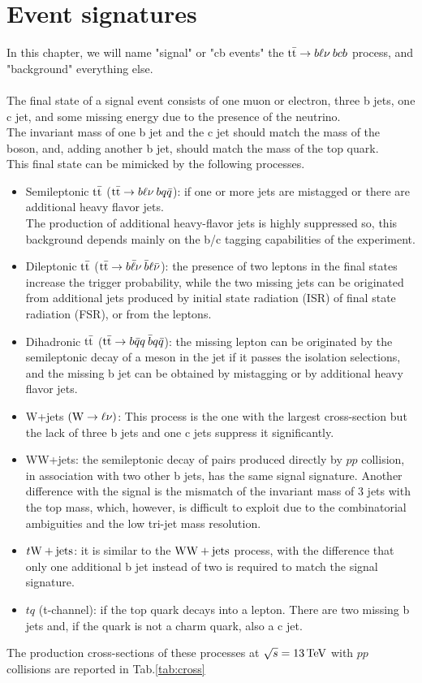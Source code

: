 \section{Event signatures}
In this chapter, we will name "signal" or "cb events" the ${{\text{t}}{\bar{\text{t}}}} \to b\ell\nu\: bcb$ process, and "background" everything else.\\
\\
The final state of a signal event consists of one muon or electron, three b jets, one c jet, and some missing energy due to the presence of the neutrino.\\
The invariant mass of one b jet and the c jet should match the mass of the \PW boson, and, adding another b jet, should match the mass of the top quark.\\
This final state can be mimicked by the following processes.
\begin{itemize}
    \item Semileptonic ${{\text{t}}{\bar{\text{t}}}}$ (${{\text{t}}{\bar{\text{t}}}}\to b\ell\nu \: bq\bar{q}$): if one or more jets are mistagged or there are additional heavy flavor jets.\\
    The production of additional heavy-flavor jets is highly suppressed so, this background depends mainly on the b/c tagging capabilities of the experiment.
    \item Dileptonic ${{\text{t}}{\bar{\text{t}}}}$ (${{\text{t}}{\bar{\text{t}}}} \to b\bar{\ell}\nu \: \bar{b}\ell\bar{\nu}$): the presence of two leptons in the final states increase the trigger probability, while the two missing jets can be originated from additional jets produced by initial state radiation (ISR) of final state radiation (FSR), or from the leptons.
    \item Dihadronic ${{\text{t}}{\bar{\text{t}}}}$ (${{\text{t}}{\bar{\text{t}}}} \to b\bar{q}q \: \bar{b}q\bar{q}$): the missing lepton can be originated by the semileptonic decay of a meson in the jet if it passes the isolation selections, and the missing b jet can be obtained by mistagging or by additional heavy flavor jets.
    \item W+jets $({\text{W}} \to \ell \nu)$: This process is the one with the largest cross-section but the lack of three b jets and one c jets suppress it significantly.
    \item WW+jets: the semileptonic decay of \PW pairs produced directly by $pp$ collision, in association with two other b jets, has the same signal signature. Another difference with the signal is the mismatch of the invariant mass of 3 jets with the top mass, which, however, is difficult to exploit due to the combinatorial ambiguities and the low tri-jet mass resolution.  
    \item $t{\text{W}}+\text{jets}$: it is similar to the ${\text{W}} {\text{W}} + \text{jets}$ process, with the difference that only one additional b jet instead of two is required to match the signal signature.
    \item $tq$ (t-channel): if the top quark decays into a lepton. There are two missing b jets and, if the quark is not a charm quark, also a c jet.
\end{itemize}
The production cross-sections of these processes  at $\sqrt{s}=13{\,\text{Te\hspace{-.08em}V}}$ with $pp$ collisions are reported in Tab.\ref{tab:cross}

